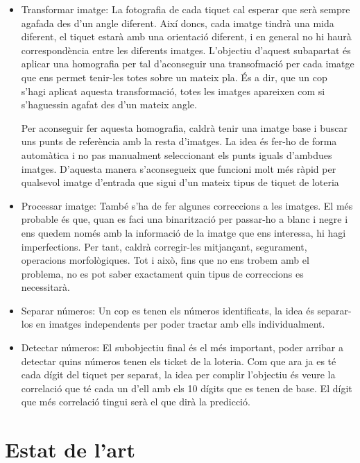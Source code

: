 ﻿\documentclass[10pt,a4paper,twocolumn,twoside]{article}
\begin{document}
\begin{itemize}
	\item Transformar imatge: La fotografia de cada tiquet cal esperar que serà sempre agafada des d’un angle diferent. Així doncs, cada imatge tindrà una mida diferent, el tiquet estarà amb una orientació diferent, i en general no hi haurà correspondència entre les diferents imatges. L’objectiu d’aquest subapartat és aplicar una homografia per tal d’aconseguir una transofmació per cada imatge que ens permet tenir-les totes sobre un mateix pla. És a dir, que un cop s’hagi aplicat aquesta transformació, totes les imatges apareixen com si s’haguessin agafat des d’un mateix angle.\par
Per aconseguir fer aquesta homografia, caldrà tenir una imatge base i buscar uns punts de referència amb la resta d’imatges. La idea és fer-ho de forma automàtica i no pas manualment seleccionant els punts iguals d’ambdues imatges. D’aquesta manera s’aconsegueix que funcioni molt més ràpid per qualsevol imatge d’entrada que sigui d’un mateix tipus de tiquet de loteria
	\item Processar imatge: També s’ha de fer algunes correccions a les imatges. El més probable és que, quan es faci una binarització per passar-ho a blanc i negre i ens quedem només amb la informació de la imatge que ens interessa, hi hagi imperfections. Per tant, caldrà corregir-les mitjançant, segurament, operacions morfològiques. Tot i això, fins que no ens trobem amb el problema, no es pot saber exactament quin tipus de correccions es necessitarà.
	\item Separar números: Un cop es tenen els números identificats, la idea és separar-los en imatges independents per poder tractar amb ells individualment.
	\item Detectar números: El subobjectiu final és el més important, poder arribar a detectar quins números tenen els ticket de la loteria. Com que ara ja es té cada dígit del tiquet per separat, la idea per complir l’objectiu és veure la correlació que té cada un d’ell amb els 10 dígits que es tenen de base. El dígit que més correlació tingui serà el que dirà la predicció.
\end{itemize}

\section{Estat de l'art}
\end{document}
